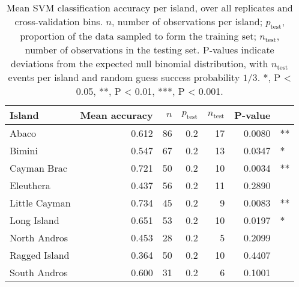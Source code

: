 \begin{table}[H]
    \caption{Mean SVM classification accuracy per island, over all replicates and cross-validation bins. $n$, number of observations per island; $p_{\mbox{test}}$, proportion of the data sampled to form the training set; $n_{\mbox{test}}$, number of observations in the testing set. P-values indicate deviations from the expected null binomial distribution, with $n_{\mbox{test}}$ events per island and random guess success probability $1/3$. *, P < 0.05, **, P < 0.01, ***, P < 0.001.}
    \centering
    \begin{tabular}{lrrrrrl}
        \hline
        Island & Mean accuracy & $n$ & $p_{\mbox{test}}$ & $n_{\mbox{test}}$ & P-value & \\
        \hline
        Abaco & 0.612 & 86 & 0.2 & 17 & 0.0080 & **\\
        Bimini & 0.547 & 67 & 0.2 & 13 & 0.0347 & *\\
        Cayman Brac & 0.721 & 50 & 0.2 & 10 & 0.0034 & **\\
        Eleuthera & 0.437 & 56 & 0.2 & 11 & 0.2890 & \\
        Little Cayman & 0.734 & 45 & 0.2 & 9 & 0.0083 & **\\
        Long Island & 0.651 & 53 & 0.2 & 10 & 0.0197 & *\\
        North Andros & 0.453 & 28 & 0.2 & 5 & 0.2099 & \\
        Ragged Island & 0.364 & 50 & 0.2 & 10 & 0.4407 & \\
        South Andros & 0.600 & 31 & 0.2 & 6 & 0.1001 & \\ 
        \hline
    \end{tabular}    
    \label{suptab:classif_svm_pca}
\end{table}

